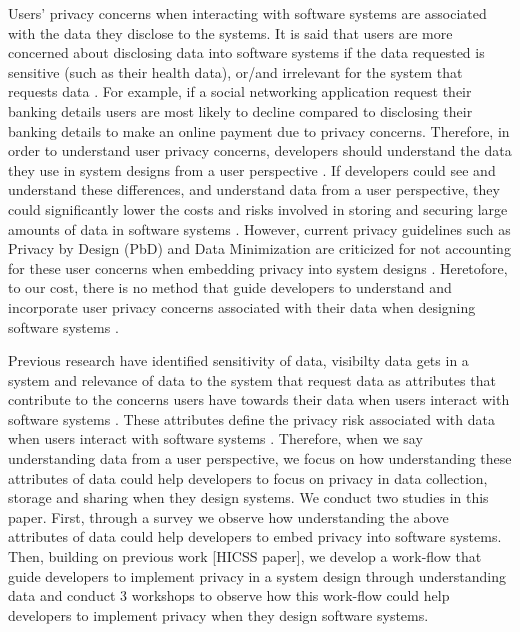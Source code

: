 \documentclass{sigchi}
\begin{document}
Users' privacy concerns when interacting with software systems are associated with the data they disclose to the systems. It is said that users are more concerned about disclosing data into software systems if the data requested is sensitive (such as their health data), or/and irrelevant for the system that requests data \cite {malheiros2013fairly, malhotra2004internet}. For example, if a social networking application request their banking details users are most likely to decline compared to disclosing their banking details to make an online payment due to privacy concerns. Therefore, in order to understand user privacy concerns, developers should understand the data they use in system designs from a user perspective \cite {marr2015big, tene2012big}. If developers could see and understand these differences, and understand data from a user perspective, they could significantly lower the costs and risks involved in storing and securing large amounts of data in software systems \cite {marr2015big, tene2012big, rubinstein2012big}. However, current privacy guidelines such as Privacy by Design (PbD) and Data Minimization are criticized for not accounting for these user concerns when embedding privacy into system designs \cite {spiekermann2012challenges}. Heretofore, to our cost, there is no method that guide developers to understand and incorporate user privacy concerns associated with their data when designing software systems \cite {omoronyia2013engineering, thomas2014distilling, senarath2018understanding}.

Previous research have identified sensitivity of data, visibilty data gets in a system and relevance of data to the system that request data as attributes that contribute to the concerns users have towards their data when users interact with software systems \cite {malheiros2013fairly, malhotra2004internet}. These attributes define the privacy risk associated with data when users interact with software systems \cite {bansal2010impact, minkus2014scale, maximilien2009privacy}. Therefore, when we say understanding data from a user perspective, we focus on how understanding these attributes of data could help developers to focus on privacy in data collection, storage and sharing when they design systems. We conduct two studies in this paper. First, through a survey we observe how understanding the above attributes of data could help developers to embed privacy into software systems. Then, building on previous work [HICSS paper], we develop a work-flow that guide developers to implement privacy in a system design through understanding data and conduct 3 workshops to observe how this work-flow could help developers to implement privacy when they design software systems.
\end{document}
